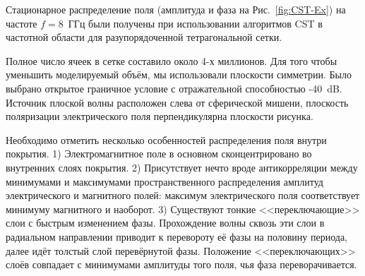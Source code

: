 Стационарное распределение поля (амплитуда  и фаза на
Рис.~\ref{fig:CST-Ex}) на частоте ${f = 8}$~ГГц были получены при
использовании алгоритмов CST в частотной области для разупорядоченной
тетрагональной сетки.
\begin{figure}
\end{figure}
Полное число ячеек в сетке составило около 4-х миллионов.  Для того
чтобы уменьшить моделируемый объём, мы использовали плоскости
симметрии.  Было выбрано открытое граничное условие с отражательной
способностью -40~dB.  Источник плоской волны расположен слева от
сферической мишени, плоскость поляризации электрического поля
перпендикулярна плоскости рисунка.

Необходимо отметить несколько особенностей распределения поля внутри
покрытия. 1) Электромагнитное поле в основном сконцентрировано во
внутренних слоях покрытия. 2) Присутствует нечто вроде антикорреляции
между минимумами и максимумами пространственного распределения
амплитуд электрического и магнитного полей: максимум электрического
поля соответствует минимуму магнитного и наоборот. 3) Существуют
тонкие <<переключающие>> слои с быстрым изменением фазы.  Прохождение
волны сквозь эти слои в радиальном направлении приводит к перевороту
её фазы на половину периода, далее идёт толстый слой перевёрнутой
фазы.  Положение <<переключающих>> слоёв совпадает с минимумами
амплитуды того поля, чья фаза переворачивается.

